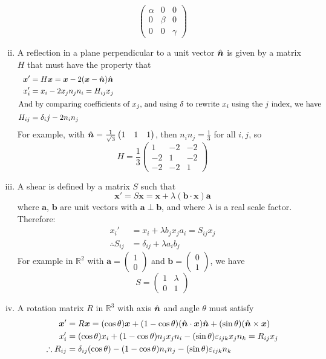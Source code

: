 \documentclass{article}
\begin{document}
\begin{enumerate}[(i)]
\[\begin{pmatrix}
			\alpha & 0 & 0 \\
			0 & \beta & 0 \\
			0 & 0 & \gamma
		\end{pmatrix} \]
		\item A reflection in a plane perpendicular to a unit vector $\hat{\bm n}$ is given by a matrix $H$ that must have the property that
		\begin{align*}
			\bm x' &= H \bm x = \bm x - 2(\bm x - \hat{\bm n}) \hat{\bm n} \\
			x_i' &= x_i - 2x_jn_jn_i = H_{ij}x_j \\
			\intertext{And by comparing coefficients of $x_j$, and using $\delta$ to rewrite $x_i$ using the $j$ index, we have}
			H_{ij} &= \delta_ij - 2n_in_j
		\end{align*}
		For example, with $\hat{\bm n} = \frac{1}{\sqrt 3}\begin{pmatrix}
			1 & 1 & 1
		\end{pmatrix}$, then $n_in_j = \frac{1}{3}$ for all $i, j$, so
		\[ H = \frac{1}{3}\begin{pmatrix}
			1 & -2 & -2 \\
			-2 & 1 & -2 \\
			-2 & -2 & 1
		\end{pmatrix} \]
		\item A shear is defined by a matrix $S$ such that
		\[ \bm x' = S\bm x = \bm x + \lambda(\bm b \cdot \bm x)\bm a \]
		where $\bm a$, $\bm b$ are unit vectors with $\bm a \perp \bm b$, and where $\lambda$ is a real scale factor. Therefore:
		\begin{align*}
			x_i' &= x_i + \lambda b_j x_j a_i = S_{ij}x_j \\
			\therefore S_{ij} &= \delta_{ij} + \lambda a_i b_j
		\end{align*}
		For example in $\mathbb R^2$ with $\bm a = \begin{pmatrix}
			1 \\ 0
		\end{pmatrix}$ and $\bm b = \begin{pmatrix}
			0 \\ 1
		\end{pmatrix}$, we have
		\[ S = \begin{pmatrix}
			1 & \lambda \\ 0 & 1
		\end{pmatrix} \]
		\item A rotation matrix $R$ in $\mathbb R^3$ with axis $\hat{\bm n}$ and angle $\theta$ must satisfy
		\begin{align*}
			\bm x' &= R\bm x = (\cos \theta)\bm x + (1 - \cos \theta)(\hat{\bm n} \cdot \bm x)\hat{\bm n} + (\sin \theta)(\hat{\bm n} \times \bm x) \\
			x_i' &= (\cos \theta)x_i + (1 - \cos \theta)n_j x_j n_i - (\sin \theta) \varepsilon_{ijk}x_j n_k = R_{ij} x_j \\
			\therefore R_{ij} &= \delta_{ij}(\cos \theta) - (1 - \cos \theta)n_in_j - (\sin \theta)\varepsilon_{ijk} n_k
		\end{align*}
	\end{enumerate}
\end{document}
